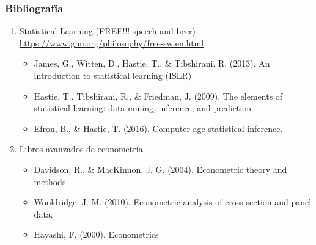 \documentclass[
  shownotes,
  xcolor={svgnames},
  hyperref={colorlinks,citecolor=DarkBlue,linkcolor=DarkRed,urlcolor=DarkBlue}
  , aspectratio=169]{beamer}
\begin{document}
\begin{frame}
\frametitle{Bibliografía}


\begin{enumerate}
  \item Statistical Learning (FREE!!! speech and beer) \url{https://www.gnu.org/philosophy/free-sw.en.html}
  \begin{itemize}
    \small
    \item James, G., Witten, D., Hastie, T., \& Tibshirani, R. (2013). An introduction to statistical learning (ISLR)
    \item Hastie, T., Tibshirani, R., \& Friedman, J. (2009). The elements of statistical learning: data mining, inference, and prediction
    \item Efron, B., \& Hastie, T. (2016). Computer age statistical inference.
  \end{itemize}
  \bigskip
  \item Libros avanzados de econometría
  \begin{itemize}
    \small
    \item Davidson, R., \& MacKinnon, J. G. (2004). Econometric theory and methods 
    \item Wooldridge, J. M. (2010). Econometric analysis of cross section and panel data. 
    \item Hayashi, F. (2000). Econometrics
  \end{itemize}
\bigskip
  \end{enumerate}





\end{frame}
\end{document}
